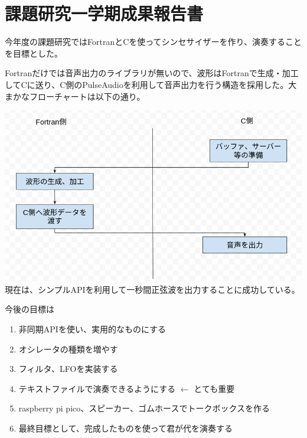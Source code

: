 \documentclass{article}
\begin{document}
\section*{課題研究一学期成果報告書}
今年度の課題研究ではFortranとCを使ってシンセサイザーを作り、演奏することを目標とした。\par
Fortranだけでは音声出力のライブラリが無いので、波形はFortranで生成・加工してCに送り、C側のPulseAudioを利用して音声出力を行う構造を採用した。大まかなフローチャートは以下の通り。\par
\includegraphics[width=175mm]{chart.png}
現在は、シンプルAPIを利用して一秒間正弦波を出力することに成功している。\par
今後の目標は
\begin{enumerate}
\item 非同期APIを使い、実用的なものにする
\item オシレータの種類を増やす
\item フィルタ、LFOを実装する
\item テキストファイルで演奏できるようにする $\leftarrow$ とても重要
\item raspberry pi pico、スピーカー、ゴムホースでトークボックスを作る
\item 最終目標として、完成したものを使って君が代を演奏する
\end{enumerate}

\end{document}
